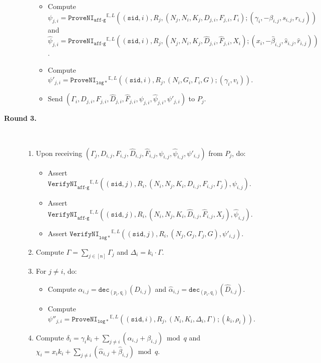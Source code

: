 \documentclass[11pt]{article}
\newcommand{\jnote}[1]{{\textcolor{blue}{Jon's note: #1}}}
\newcommand{\dec}{\ensuremath{\mathtt{dec}}}
\newcommand{\sid}{\ensuremath{\mathtt{sid}}}
\newcommand{\proveni}[1]{\ensuremath{\mathtt{ProveNI}_{\mathtt{#1}}}}
\newcommand{\verifyni}[1]{\ensuremath{\mathtt{VerifyNI}_{\mathtt{#1}}}}
\newcommand{\E}{\mathbb{E}}
\newcommand{\?}[1]{\stackrel{?}{#1}}
\begin{document}
\begin{description}
\begin{itemize}
\begin{itemize}
            \item Compute $\psi_{j,i} = \proveni{aff\mbox{-}g}^{\E,L}((\sid, i), R_j, (N_j, N_i, K_j, D_{j,i}, F_{j,i}, \Gamma_i); (\gamma_i, -\beta_{i,j}, s_{i,j}, r_{i,j}))$ and
            $\hat{\psi}_{j,i} = \proveni{aff\mbox{-}g}^{\E,L}((\sid, i), R_j, (N_j, N_i, K_j, \hat{D}_{j,i}, \hat{F}_{j,i}, X_i); (x_i, -\hat{\beta}_{i,j}, \hat{s}_{i,j}, \hat{r}_{i,j}))$. 
            
            \item Compute $\psi'_{j,i} = \proveni{log*}^{\E,L}((\sid, i),R_j, (N_i, G_i, \Gamma_i, G); (\gamma_i, v_i))$.
\item         Send $(\Gamma_i, D_{j,i}, F_{j,i}, \hat{D}_{j,i}, \hat{F}_{j,i}, \psi_{j,i}, \hat{\psi}_{j,i}, \psi'_{j,i})$
        to $P_j$.
        \end{itemize}
        \end{itemize}

    \item[\textbf{Round 3.}] \ 
    \begin{enumerate}
        \item Upon receiving $(\Gamma_j, D_{i,j}, F_{i,j}, \hat{D}_{i,j}, \hat{F}_{i,j}, \psi_{i,j}, \hat{\psi}_{i,j}, \psi'_{i,j})$ from $P_j$, do:

        \begin{itemize}
            \item Assert $\verifyni{aff\mbox{-}g}^{\E,L}((\sid, j), R_i, (N_i, N_j, K_i, D_{i,j}, F_{i,j}, \Gamma_j), \psi_{i,j})$.
            \item Assert $\verifyni{aff\mbox{-}g}^{\E,L}((\sid, j), R_i, (N_i, N_j, K_i, \hat{D}_{i,j}, \hat{F}_{i,j}, X_j), \hat{\psi}_{i,j})$.
            \item Assert $\verifyni{log*}^{\E,L}((\sid, j), R_i, (N_j, G_j, \Gamma_j, G), \psi'_{i,j})$.
        \end{itemize}

        \item Compute $\Gamma = \sum_{j\in [n]} \Gamma_j$ and $\Delta_i = k_i \cdot \Gamma$.

        \item For $j \ne i$, do:
        \begin{itemize}
            \item Compute $\alpha_{i,j} = \dec_{(p_i,q_i)}(D_{i,j})$ and $\hat{\alpha}_{i,j} = \dec_{(p_i,q_i)}(\hat{D}_{i,j})$.
            \item Compute $\psi''_{j,i} = \proveni{log*}^{\E,L}((\sid, i), R_j,(N_i, K_i, \Delta_i, \Gamma); (k_i, \rho_i))$.
        \end{itemize}
        \item  Compute $\delta_i = \gamma_i k_i + \sum_{j \ne i}(\alpha_{i,j} + \beta_{i,j}) \bmod q$ and
            $\chi_i = x_i k_i + \sum_{j \ne i}(\hat{\alpha}_{i,j} + \hat{\beta}_{i,j}) \bmod q$. 


\end{enumerate}
\end{description}
\end{document}
